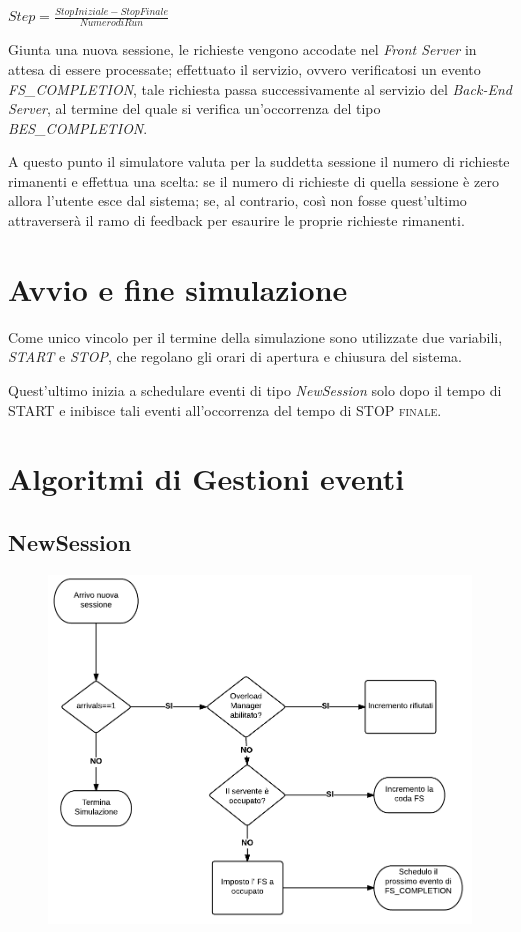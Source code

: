 \begin{center}
 $Step = \frac{Stop Iniziale - Stop Finale}{Numero di Run}$
\end{center}

Giunta una nuova sessione, le richieste vengono accodate nel \textit{Front Server} in attesa di essere processate; effettuato il servizio, ovvero verificatosi un evento \textit{FS\_COMPLETION}, tale richiesta passa successivamente al servizio del \textit{Back-End Server}, al termine del quale si verifica un'occorrenza del tipo \textit{BES\_COMPLETION}. 

A questo punto il simulatore valuta per la suddetta sessione il numero di richieste rimanenti e effettua una scelta: se il numero di richieste di quella sessione è zero allora l'utente esce dal sistema; se, al contrario, così non fosse quest'ultimo attraverserà il ramo di feedback per esaurire le proprie richieste rimanenti.


\section{Avvio e fine simulazione}
Come unico vincolo per il termine della simulazione sono utilizzate due variabili, \textit{START} e \textit{STOP}, che regolano gli orari di apertura e chiusura del sistema.

\noindent Quest'ultimo inizia a schedulare eventi di tipo \textit{NewSession} solo dopo il tempo di \textsc{START} e inibisce tali eventi all'occorrenza del tempo di \textsc{STOP finale}.
\section{Algoritmi di Gestioni eventi}
\subsection{NewSession}
\begin{figure}[H]
  \centering
  \includegraphics[scale=0.35]{img/NewSession.png}
  \label{fig:NewSession}
\end{figure}
